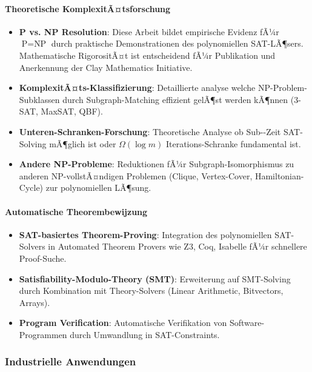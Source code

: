 ﻿\documentclass[a4paper,12pt]{article}
\theoremstyle{definition}
\begin{document}
\paragraph{Theoretische KomplexitÃ¤tsforschung}

\begin{itemize}
	\item \textbf{P vs. NP Resolution}: Diese Arbeit bildet empirische Evidenz fÃ¼r $\text{P} = \text{NP}$ durch praktische Demonstrationen des polynomiellen SAT-LÃ¶sers. Mathematische RigorositÃ¤t ist entscheidend fÃ¼r Publikation und Anerkennung der Clay Mathematics Initiative.
	
	\item \textbf{KomplexitÃ¤ts-Klassifizierung}: Detaillierte analyse welche NP-Problem-Subklassen durch Subgraph-Matching effizient gelÃ¶st werden kÃ¶nnen (3-SAT, MaxSAT, QBF).
	
	\item \textbf{Unteren-Schranken-Forschung}: Theoretische Analyse ob Sub-\cite{Epp26}-Zeit SAT-Solving mÃ¶glich ist oder $\Omega(\log m)$ Iterations-Schranke fundamental ist.
	
	\item \textbf{Andere NP-Probleme}: Reduktionen fÃ¼r Subgraph-Isomorphismus zu anderen NP-vollstÃ¤ndigen Problemen (Clique, Vertex-Cover, Hamiltonian-Cycle) zur polynomiellen LÃ¶sung.
\end{itemize}

\paragraph{Automatische Theorembewijzung}

\begin{itemize}
	\item \textbf{SAT-basiertes Theorem-Proving}: Integration des polynomiellen SAT-Solvers in Automated Theorem Provers wie Z3, Coq, Isabelle fÃ¼r schnellere Proof-Suche.
	
	\item \textbf{Satisfiability-Modulo-Theory (SMT)}: Erweiterung auf SMT-Solving durch Kombination mit Theory-Solvers (Linear Arithmetic, Bitvectors, Arrays).
	
	\item \textbf{Program Verification}: Automatische Verifikation von Software-Programmen durch Umwandlung in SAT-Constraints.
\end{itemize}

\subsubsection{Industrielle Anwendungen}
\end{document}
